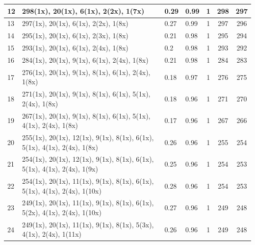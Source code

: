 \begin{small}
\begin{longtable}{|p{0.5cm}|p{9cm}|p{1.3cm}|p{1.3cm}|c|c|c|}
  12 & 298(1x), 20(1x), 6(1x), 2(2x), 1(7x) & \cellcolor{colorGood}  0.29 & \cellcolor{colorGood} 0.99 & 1 & 298 & \cellcolor{colorBad} 297 \\   \hline
  13 & 297(1x), 20(1x), 6(1x), 2(2x), 1(8x) & \cellcolor{colorGood}  0.27 & \cellcolor{colorGood} 0.99 & 1 & 297 & \cellcolor{colorBad} 296 \\   \hline
  14 & 295(1x), 20(1x), 6(1x), 2(3x), 1(8x) & \cellcolor{colorGood}  0.21 & \cellcolor{colorGood} 0.98 & 1 & 295 & \cellcolor{colorBad} 294 \\   \hline
  15 & 293(1x), 20(1x), 6(1x), 2(4x), 1(8x) & \cellcolor{colorGood}  0.2 & \cellcolor{colorGood} 0.98 & 1 & 293 & \cellcolor{colorBad} 292 \\   \hline
  16 & 284(1x), 20(1x), 9(1x), 6(1x), 2(4x), 1(8x) & \cellcolor{colorGood}  0.21 & \cellcolor{colorGood} 0.98 & 1 & 284 & \cellcolor{colorBad} 283 \\   \hline
  17 & 276(1x), 20(1x), 9(1x), 8(1x), 6(1x), 2(4x), 1(8x) & \cellcolor{colorGood}  0.18 & \cellcolor{colorGood} 0.97 & 1 & 276 & \cellcolor{colorBad} 275 \\   \hline
  18 & 271(1x), 20(1x), 9(1x), 8(1x), 6(1x), 5(1x), 2(4x), 1(8x) & \cellcolor{colorGood}  0.18 & \cellcolor{colorGood} 0.96 & 1 & 271 & \cellcolor{colorBad} 270 \\   \hline
  19 & 267(1x), 20(1x), 9(1x), 8(1x), 6(1x), 5(1x), 4(1x), 2(4x), 1(8x) & \cellcolor{colorGood}  0.17 & \cellcolor{colorGood} 0.96 & 1 & 267 & \cellcolor{colorBad} 266 \\   \hline
  20 & 255(1x), 20(1x), 12(1x), 9(1x), 8(1x), 6(1x), 5(1x), 4(1x), 2(4x), 1(8x) & \cellcolor{colorGood}  0.26 & \cellcolor{colorGood} 0.96 & 1 & 255 & \cellcolor{colorBad} 254 \\   \hline
  21 & 254(1x), 20(1x), 12(1x), 9(1x), 8(1x), 6(1x), 5(1x), 4(1x), 2(4x), 1(9x) & \cellcolor{colorGood}  0.25 & \cellcolor{colorGood} 0.96 & 1 & 254 & \cellcolor{colorBad} 253 \\   \hline
  22 & 254(1x), 20(1x), 11(1x), 9(1x), 8(1x), 6(1x), 5(1x), 4(1x), 2(4x), 1(10x) & \cellcolor{colorGood}  0.28 & \cellcolor{colorGood} 0.96 & 1 & 254 & \cellcolor{colorBad} 253 \\   \hline
  23 & 249(1x), 20(1x), 11(1x), 9(1x), 8(1x), 6(1x), 5(2x), 4(1x), 2(4x), 1(10x) & \cellcolor{colorGood}  0.27 & \cellcolor{colorGood} 0.96 & 1 & 249 & \cellcolor{colorBad} 248 \\   \hline
  24 & 249(1x), 20(1x), 11(1x), 9(1x), 8(1x), 5(3x), 4(1x), 2(4x), 1(11x) & \cellcolor{colorGood}  0.26 & \cellcolor{colorGood} 0.96 & 1 & 249 & \cellcolor{colorBad} 248 \\   \hline

\end{longtable}
\end{small}
